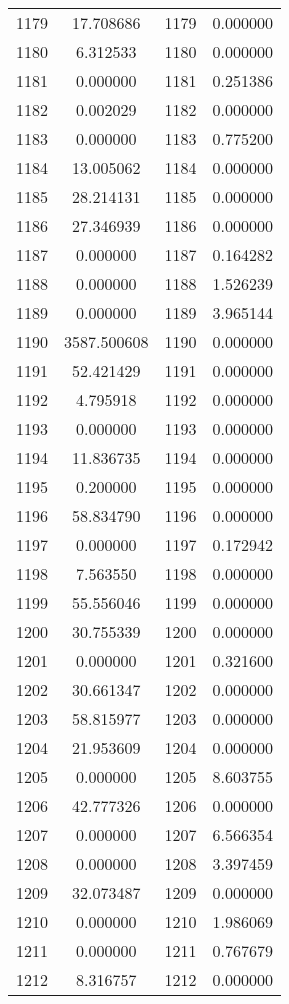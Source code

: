 \documentclass[12pt]{article}
\begin{document}
\begin{longtable}{@{}cccc@{}}
1179 & 17.708686 & 1179 & 0.000000 \\
1180 & 6.312533 & 1180 & 0.000000 \\
1181 & 0.000000 & 1181 & 0.251386 \\
1182 & 0.002029 & 1182 & 0.000000 \\
1183 & 0.000000 & 1183 & 0.775200 \\
1184 & 13.005062 & 1184 & 0.000000 \\
1185 & 28.214131 & 1185 & 0.000000 \\
1186 & 27.346939 & 1186 & 0.000000 \\
1187 & 0.000000 & 1187 & 0.164282 \\
1188 & 0.000000 & 1188 & 1.526239 \\
1189 & 0.000000 & 1189 & 3.965144 \\
1190 & 3587.500608 & 1190 & 0.000000 \\
1191 & 52.421429 & 1191 & 0.000000 \\
1192 & 4.795918 & 1192 & 0.000000 \\
1193 & 0.000000 & 1193 & 0.000000 \\
1194 & 11.836735 & 1194 & 0.000000 \\
1195 & 0.200000 & 1195 & 0.000000 \\
1196 & 58.834790 & 1196 & 0.000000 \\
1197 & 0.000000 & 1197 & 0.172942 \\
1198 & 7.563550 & 1198 & 0.000000 \\
1199 & 55.556046 & 1199 & 0.000000 \\
1200 & 30.755339 & 1200 & 0.000000 \\
1201 & 0.000000 & 1201 & 0.321600 \\
1202 & 30.661347 & 1202 & 0.000000 \\
1203 & 58.815977 & 1203 & 0.000000 \\
1204 & 21.953609 & 1204 & 0.000000 \\
1205 & 0.000000 & 1205 & 8.603755 \\
1206 & 42.777326 & 1206 & 0.000000 \\
1207 & 0.000000 & 1207 & 6.566354 \\
1208 & 0.000000 & 1208 & 3.397459 \\
1209 & 32.073487 & 1209 & 0.000000 \\
1210 & 0.000000 & 1210 & 1.986069 \\
1211 & 0.000000 & 1211 & 0.767679 \\
1212 & 8.316757 & 1212 & 0.000000 \\

\end{longtable}
\end{document}
